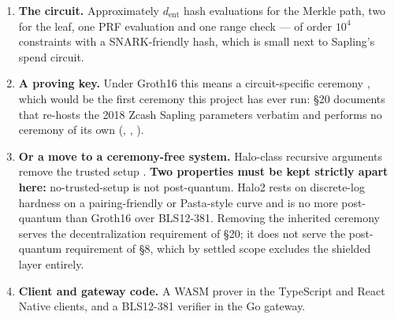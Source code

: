 \begin{enumerate}
  \item \textbf{The circuit.} Approximately $d_{\mathrm{ent}}$ hash evaluations for the Merkle path,
    two for the leaf, one PRF evaluation and one range check --- of order $10^4$ constraints with a
    SNARK-friendly hash, which is small next to Sapling's spend circuit.
  \item \textbf{A proving key.} Under Groth16 this means a circuit-specific ceremony
    \citep{groth2016size,bowe2017mpc}, which would be the first ceremony this project has ever run:
    \S20 documents that \fluxd{} re-hosts the 2018 Zcash Sapling parameters verbatim and performs no
    ceremony of its own (\shipped, ,
    ).
  \item \textbf{Or a move to a ceremony-free system.} Halo-class recursive arguments remove the
    trusted setup \citep{bowe2019halo}. \textbf{Two properties must be kept strictly apart here:}
    no-trusted-setup is not post-quantum. Halo2 rests on discrete-log hardness on a pairing-friendly
    or Pasta-style curve and is no more post-quantum than Groth16 over BLS12-381. Removing the
    inherited ceremony serves the decentralization requirement of \S20; it does not serve the
    post-quantum requirement of \S8, which by settled scope excludes the shielded layer entirely.
  \item \textbf{Client and gateway code.} A WASM prover in the TypeScript and React Native clients,
    and a BLS12-381 verifier in the Go gateway.
\end{enumerate}



